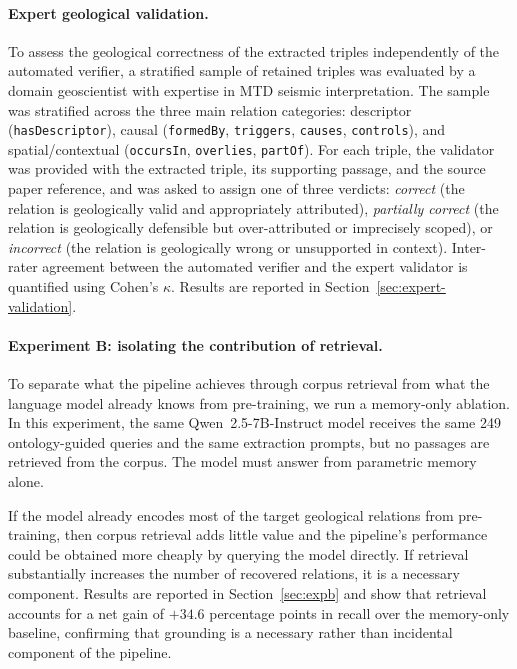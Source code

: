 \documentclass[10pt]{article}
\newcommand{\pred}[1]{\texttt{\small #1}}
\begin{document}
\paragraph{Expert geological validation.}

To assess the geological correctness of the extracted
triples independently of the automated verifier, a
stratified sample of retained triples was evaluated by a
domain geoscientist with expertise in MTD seismic
interpretation.
The sample was stratified across the three main relation
categories: descriptor (\pred{hasDescriptor}), causal
(\pred{formedBy}, \pred{triggers}, \pred{causes},
\pred{controls}), and spatial/contextual (\pred{occursIn},
\pred{overlies}, \pred{partOf}).
For each triple, the validator was provided with the
extracted triple, its supporting passage, and the source
paper reference, and was asked to assign one of three
verdicts: \emph{correct} (the relation is geologically
valid and appropriately attributed), \emph{partially
correct} (the relation is geologically defensible but
over-attributed or imprecisely scoped), or
\emph{incorrect} (the relation is geologically wrong or
unsupported in context).
Inter-rater agreement between the automated verifier and the
expert validator is quantified using Cohen's $\kappa$.
Results are reported in Section~\ref{sec:expert-validation}.

\paragraph{Experiment B: isolating the contribution of
retrieval.}

To separate what the pipeline achieves through corpus
retrieval from what the language model already knows from
pre-training, we run a memory-only ablation.
In this experiment, the same Qwen~2.5-7B-Instruct model
receives the same 249 ontology-guided queries and the same
extraction prompts, but no passages are retrieved from the
corpus.
The model must answer from parametric memory alone.

If the model already encodes most of the target geological
relations from pre-training, then corpus retrieval adds
little value and the pipeline's performance could be
obtained more cheaply by querying the model directly.
If retrieval substantially increases the number of recovered
relations, it is a necessary component.
Results are reported in Section~\ref{sec:expb} and show
that retrieval accounts for a net gain of $+34.6$ percentage
points in recall over the memory-only baseline, confirming
that grounding is a necessary rather than incidental
component of the pipeline.
\end{document}
